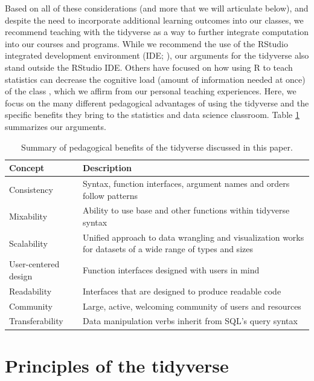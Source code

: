\documentclass[12pt]{article}
\begin{document}
Based on all of these considerations (and more that we will articulate
below), and despite the need to incorporate additional learning outcomes
into our classes, we recommend teaching with the tidyverse as a way to
further integrate computation into our courses and programs. While we
recommend the use of the RStudio integrated development environment
(IDE; \citet{rstudio}), our arguments for the tidyverse also stand
outside the RStudio IDE. Others have focused on how using R to teach
statistics can decrease the cognitive load (amount of information needed
at once) of the class
\citep{Pruim2017, guzman2019successful, tuckerstatistics2021}, which we
affirm from our personal teaching experiences. Here, we focus on the
many different pedagogical advantages of using the tidyverse and the
specific benefits they bring to the statistics and data science
classroom. Table \ref{tab:summary} summarizes our arguments.

\linespread{1}
\begin{table}

\caption{\label{tab:tab:summary}Summary of pedagogical benefits of the tidyverse discussed in this paper.\label{tab:summary}}
\centering
\begin{tabular}[t]{l|>{\raggedright\arraybackslash}p{28em}}
\hline
Concept & Description\\
\hline
Consistency & Syntax, function interfaces, argument names and orders follow patterns\\
\hline
Mixability & Ability to use base and other functions within tidyverse syntax\\
\hline
Scalability & Unified approach to data wrangling and visualization works for datasets of a wide range of types and sizes\\
\hline
User-centered design & Function interfaces designed with users in mind\\
\hline
Readability & Interfaces that are designed to produce readable code\\
\hline
Community & Large, active, welcoming community of users and resources\\
\hline
Transferability & Data manipulation verbs inherit from SQL's query syntax\\
\hline
\end{tabular}
\end{table}\linespread{2}
\vspace{3mm}\setlength{\parindent}{15pt}

\hypertarget{sec:principles}{%
\section{Principles of the tidyverse}\label{sec:principles}}
\end{document}
